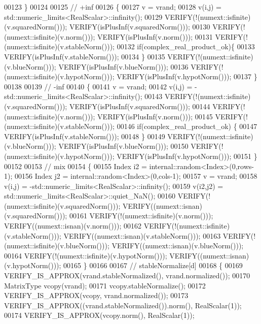 \begin{DoxyCode}
00123   \}
00124   
00125   \textcolor{comment}{// +inf}
00126   \{
00127     v = vrand;
00128     v(i,j) = std::numeric\_limits<RealScalar>::infinity();
00129     VERIFY(!(numext::isfinite)(v.squaredNorm()));   VERIFY(isPlusInf(v.squaredNorm()));
00130     VERIFY(!(numext::isfinite)(v.norm()));          VERIFY(isPlusInf(v.norm()));
00131     VERIFY(!(numext::isfinite)(v.stableNorm()));
00132     \textcolor{keywordflow}{if}(complex\_real\_product\_ok)\{
00133       VERIFY(isPlusInf(v.stableNorm()));
00134     \}
00135     VERIFY(!(numext::isfinite)(v.blueNorm()));      VERIFY(isPlusInf(v.blueNorm()));
00136     VERIFY(!(numext::isfinite)(v.hypotNorm()));     VERIFY(isPlusInf(v.hypotNorm()));
00137   \}
00138   
00139   \textcolor{comment}{// -inf}
00140   \{
00141     v = vrand;
00142     v(i,j) = -std::numeric\_limits<RealScalar>::infinity();
00143     VERIFY(!(numext::isfinite)(v.squaredNorm()));   VERIFY(isPlusInf(v.squaredNorm()));
00144     VERIFY(!(numext::isfinite)(v.norm()));          VERIFY(isPlusInf(v.norm()));
00145     VERIFY(!(numext::isfinite)(v.stableNorm()));
00146     \textcolor{keywordflow}{if}(complex\_real\_product\_ok) \{
00147       VERIFY(isPlusInf(v.stableNorm()));
00148     \}
00149     VERIFY(!(numext::isfinite)(v.blueNorm()));      VERIFY(isPlusInf(v.blueNorm()));
00150     VERIFY(!(numext::isfinite)(v.hypotNorm()));     VERIFY(isPlusInf(v.hypotNorm()));
00151   \}
00152   
00153   \textcolor{comment}{// mix}
00154   \{
00155     Index i2 = internal::random<Index>(0,rows-1);
00156     Index j2 = internal::random<Index>(0,cols-1);
00157     v = vrand;
00158     v(i,j) = -std::numeric\_limits<RealScalar>::infinity();
00159     v(i2,j2) = std::numeric\_limits<RealScalar>::quiet\_NaN();
00160     VERIFY(!(numext::isfinite)(v.squaredNorm()));   VERIFY((numext::isnan)(v.squaredNorm()));
00161     VERIFY(!(numext::isfinite)(v.norm()));          VERIFY((numext::isnan)(v.norm()));
00162     VERIFY(!(numext::isfinite)(v.stableNorm()));    VERIFY((numext::isnan)(v.stableNorm()));
00163     VERIFY(!(numext::isfinite)(v.blueNorm()));      VERIFY((numext::isnan)(v.blueNorm()));
00164     VERIFY(!(numext::isfinite)(v.hypotNorm()));     VERIFY((numext::isnan)(v.hypotNorm()));
00165   \}
00166 
00167   \textcolor{comment}{// stableNormalize[d]}
00168   \{
00169     VERIFY\_IS\_APPROX(vrand.stableNormalized(), vrand.normalized());
00170     MatrixType vcopy(vrand);
00171     vcopy.stableNormalize();
00172     VERIFY\_IS\_APPROX(vcopy, vrand.normalized());
00173     VERIFY\_IS\_APPROX((vrand.stableNormalized()).norm(), RealScalar(1));
00174     VERIFY\_IS\_APPROX(vcopy.norm(), RealScalar(1));

\end{DoxyCode}
